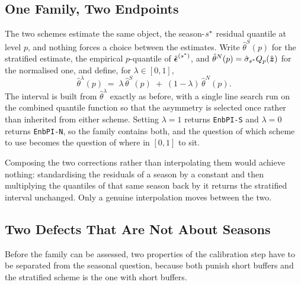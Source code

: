 \subsection{One Family, Two Endpoints}
\label{sec:algorithm:family}

The two schemes estimate the same object, the season-$s^*$ residual
quantile at level $p$, and nothing forces a choice between the estimates.
Write $\hat{\theta}^{S}(p)$ for the stratified estimate, the empirical
$p$-quantile of $\hat{\boldsymbol\epsilon}^{(s^*)}$, and
$\hat{\theta}^{N}(p) = \hat{\sigma}_{s^*}Q_{p}\!\left(\hat{\boldsymbol z}\right)$
for the normalised one, and define, for $\lambda \in [0,1]$,
\begin{equation}
  \label{eq:family}
  \hat{\theta}^{\lambda}(p)
  \;=\;
  \lambda\,\hat{\theta}^{S}(p)
  \;+\;
  (1-\lambda)\,\hat{\theta}^{N}(p).
\end{equation}
The interval is built from $\hat{\theta}^{\lambda}$ exactly as before, with
a single line search run on the combined quantile function so that the
asymmetry is selected once rather than inherited from either scheme.
Setting $\lambda = 1$ returns \texttt{EnbPI-S} and $\lambda = 0$ returns
\texttt{EnbPI-N}, so the family contains both, and the question of which
scheme to use becomes the question of where in $[0,1]$ to sit.

Composing the two corrections rather than interpolating them would
achieve nothing: standardising the residuals of a season by a constant and
then multiplying the quantiles of that same season back by it returns the
stratified interval unchanged.  Only a genuine interpolation moves between
the two.

\subsection{Two Defects That Are Not About Seasons}
\label{sec:algorithm:defects}

Before the family can be assessed, two properties of the calibration step
have to be separated from the seasonal question, because both punish short
buffers and the stratified scheme is the one with short buffers.

